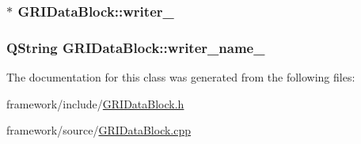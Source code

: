 \hypertarget{classGRIDataBlock_a7e302800f9de02e958c6b66857f5df39}{
\subsubsection[{writer\-\_\-}]{$\ast$ {\bf \-G\-R\-I\-Data\-Block\-::writer\-\_\-}}}\label{classGRIDataBlock_a7e302800f9de02e958c6b66857f5df39}
\hypertarget{classGRIDataBlock_ad2d65d8c5f401bf5726f5a7fd6478e62}{
\subsubsection[{writer\-\_\-name\-\_\-}]{\setlength{\rightskip}{0pt plus 5cm}\-Q\-String {\bf \-G\-R\-I\-Data\-Block\-::writer\-\_\-name\-\_\-}}}\label{classGRIDataBlock_ad2d65d8c5f401bf5726f5a7fd6478e62}


\-The documentation for this class was generated from the following files\-:\begin{DoxyCompactItemize}
\item 
framework/include/\hyperlink{GRIDataBlock_8h}{\-G\-R\-I\-Data\-Block.\-h}\item 
framework/source/\hyperlink{GRIDataBlock_8cpp}{\-G\-R\-I\-Data\-Block.\-cpp}\end{DoxyCompactItemize}

